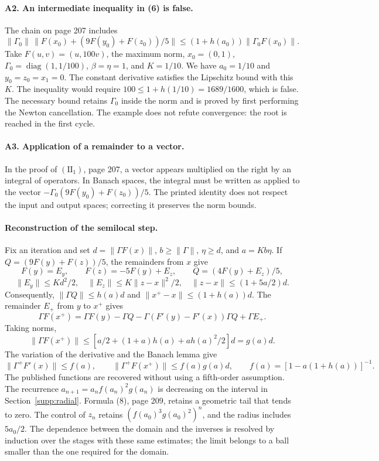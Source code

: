 \documentclass[11pt,a4paper]{article}
\numberwithin{equation}{section}
\numberwithin{table}{section}
\theoremstyle{plain}
\theoremstyle{definition}\newtheorem{definition}[theorem]{Definition}
\theoremstyle{remark}\newtheorem{remark}[theorem]{Remark}
\begin{document}
\paragraph{A2. An intermediate inequality in (6) is false.}
The chain on page 207 includes
\[
 \|\Gamma_0\|\,\|F(x_0)+(9F(y_0)+F(z_0))/5\|
 \leq(1+h(a_0))\|\Gamma_0F(x_0)\|.
\]
Take $F(u,v)=(u,100v)$, the maximum norm, $x_0=(0,1)$,
$\Gamma_0=\operatorname{diag}(1,1/100)$, $\beta=\eta=1$, and $K=1/10$.
We have $a_0=1/10$ and $y_0=z_0=x_1=0$. The constant derivative
satisfies the Lipschitz bound with this $K$. The inequality would
require $100\leq1+h(1/10)=1689/1600$, which is false. The necessary
bound retains $\Gamma_0$ inside the norm and is proved by first
performing the Newton cancellation. The example does not refute
convergence: the root is reached in the first cycle.

\paragraph{A3. Application of a remainder to a vector.}
In the proof of $(\mathrm{II}_1)$, page 207, a vector appears
multiplied on the right by an integral of operators. In Banach spaces,
the integral must be written as applied to the vector
$-\Gamma_0(9F(y_0)+F(z_0))/5$. The printed identity does not respect
the input and output spaces; correcting it preserves the norm bounds.

\paragraph{Reconstruction of the semilocal step.}
Fix an iteration and set $d=\|\Gamma F(x)\|$, $b\geq\|\Gamma\|$,
$\eta\geq d$, and $a=Kb\eta$. If $Q=(9F(y)+F(z))/5$, the remainders
from $x$ give
\[
 F(y)=E_y,\qquad F(z)=-5F(y)+E_z,\qquad Q=(4F(y)+E_z)/5,
\]
\[
 \|E_y\|\leq Kd^2/2,\quad \|E_z\|\leq K\|z-x\|^2/2,
 \quad \|z-x\|\leq(1+5a/2)d.
\]
Consequently, $\|\Gamma Q\|\leq h(a)d$ and
$\|x^+-x\|\leq(1+h(a))d$. The remainder $E_+$ from $y$ to $x^+$ gives
\[
 \Gamma F(x^+)=\Gamma F(y)-\Gamma Q
 -\Gamma(F'(y)-F'(x))\Gamma Q+\Gamma E_+.
\]
Taking norms,
\[
 \|\Gamma F(x^+)\|\leq[a/2+(1+a)h(a)+ah(a)^2/2]d=g(a)d.
\]
The variation of the derivative and the Banach lemma give
\[
 \|\Gamma^+F'(x)\|\leq f(a),\qquad
 \|\Gamma^+F(x^+)\|\leq f(a)g(a)d,\qquad
 f(a)=[1-a(1+h(a))]^{-1}.
\]
The published functions are recovered without using a fifth-order
assumption. The recurrence $a_{n+1}=a_nf(a_n)^2g(a_n)$ is decreasing
on the interval in Section~\ref{supp:radial}. Formula (8), page 209,
retains a geometric tail that tends to zero. The control of $z_n$
retains $(f(a_0)^3g(a_0)^2)^n$, and the radius includes $5a_0/2$.
The dependence between the domain and the inverses is resolved by
induction over the stages with these same estimates; the limit belongs
to a ball smaller than the one required for the domain.
\end{document}

